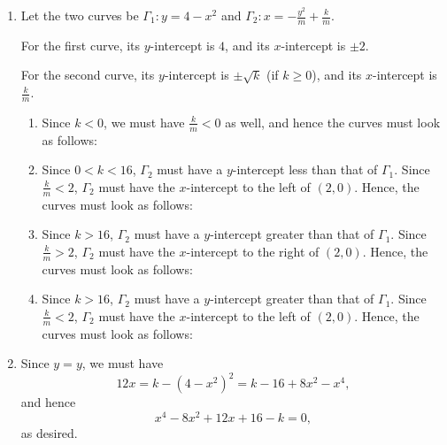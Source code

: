\Question{\currfilebase}

\begin{enumerate}
    \item Let the two curves be \(\Gamma_1: y = 4 - x^2\) and \(\Gamma_2: x = - \frac{y^2}{m} + \frac{k}{m}\).

          For the first curve, its \(y\)-intercept is \(4\), and its \(x\)-intercept is \(\pm 2\).

          For the second curve, its \(y\)-intercept is \(\pm \sqrt{k}\) (if \(k \geq 0\)), and its \(x\)-intercept is \(\frac{k}{m}\).

          \begin{enumerate}
              \item Since \(k < 0\), we must have \(\frac{k}{m} < 0\) as well, and hence the curves must look as follows:
                    \begin{center}
                        
                    \end{center}
              \item Since \(0 < k < 16\), \(\Gamma_2\) must have a \(y\)-intercept less than that of \(\Gamma_1\). Since \(\frac{k}{m} < 2\), \(\Gamma_2\) must have the \(x\)-intercept to the left of \((2, 0)\). Hence, the curves must look as follows:
                    \begin{center}
                        
                    \end{center}
              \item Since \(k > 16\), \(\Gamma_2\) must have a \(y\)-intercept greater than that of \(\Gamma_1\). Since \(\frac{k}{m} > 2\), \(\Gamma_2\) must have the \(x\)-intercept to the right of \((2, 0)\). Hence, the curves must look as follows:
                    \begin{center}
                        
                    \end{center}
              \item Since \(k > 16\), \(\Gamma_2\) must have a \(y\)-intercept greater than that of \(\Gamma_1\). Since \(\frac{k}{m} < 2\), \(\Gamma_2\) must have the \(x\)-intercept to the left of \((2, 0)\). Hence, the curves must look as follows:
                    \begin{center}
                        
                    \end{center}
          \end{enumerate}
    \item Since \(y = y\), we must have
          \[
              12x = k - (4 - x^2)^2 = k - 16 + 8 x^2 - x^4,
          \]
          and hence
          \[
              x^4 - 8x^2 + 12 x + 16 - k = 0,
          \]
          as desired.


\end{enumerate}
